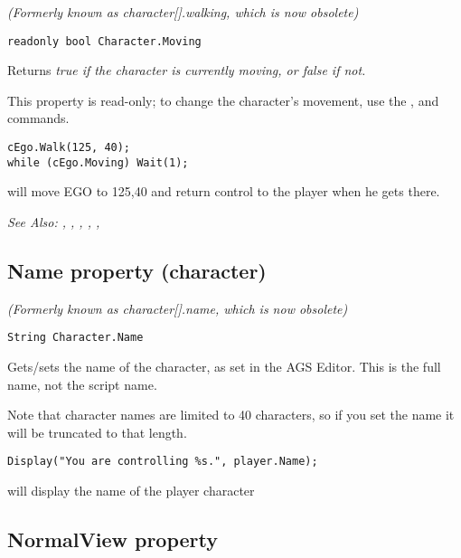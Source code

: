 \it{(Formerly known as character[].walking, which is now obsolete)}

\begin{verbatim}
readonly bool Character.Moving
\end{verbatim}
Returns \it{true} if the character is currently moving, or \it{false} if not.

This property is read-only; to change the character's movement, use the ,
 and  commands.

\begin{verbatim}
cEgo.Walk(125, 40);
while (cEgo.Moving) Wait(1);
\end{verbatim}
will move EGO to 125,40 and return control to the player when he gets there.

\it{See Also:} ,
,
,
,
,


\subsection{Name property (character)}\label{Character.Name}%

\it{(Formerly known as character[].name, which is now obsolete)}

\begin{verbatim}
String Character.Name
\end{verbatim}
Gets/sets the name of the character, as set in the AGS Editor. This is the full name,
not the script name.

Note that character names are limited to 40 characters, so if you set the name it
will be truncated to that length.

\begin{verbatim}
Display("You are controlling %s.", player.Name);
\end{verbatim}
will display the name of the player character


\subsection{NormalView property}\label{Character.NormalView}%


